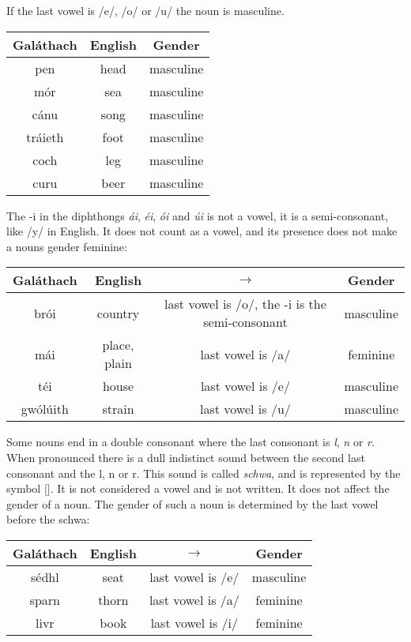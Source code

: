 If the last vowel is /e/, /o/ or /u/ the noun is masculine.
\begin{table}[H]
\centering
\begin{tabu}{c|c|c}
  \textbf{Gal\'{a}thach} & \textbf{English} & \textbf{Gender}\\
  \toprule
  pen & head & masculine\\
  m\'{o}r & sea & masculine\\
  c\'{a}nu & song & masculine\\
  tr\'{a}ieth & foot & masculine\\
  coch & leg & masculine\\
  curu & beer & masculine
\end{tabu}
\label{example_gender_last_vowel_eou}
\end{table}

The -i in the diphthongs \textit{\'{a}i}, \textit{\'{e}i}, \textit{\'{o}i} and \textit{\'{u}i} is not a vowel, it is a semi-consonant, like /y/ in English. It does not count as a vowel, and its presence does not make a nouns gender feminine:
\begin{table}[H]
\centering
\begin{tabu}{c|c|c|c}
  \textbf{Gal\'{a}thach} & \textbf{English} & $\rightarrow$ & \textbf{Gender}\\
  \toprule
  br\'{o}i & country & last vowel is /o/, the -i is the semi-consonant & masculine\\
  m\'{a}i & place, plain & last vowel is /a/ & feminine\\
  t\'{e}i & house & last vowel is /e/ & masculine\\
  gw\'{o}l\'{u}ith & strain & last vowel is /u/ & masculine
\end{tabu}
\label{example_gender_last_vowel_semi_consonant}
\end{table}

Some nouns end in a double consonant where the last consonant is \textit{l}, \textit{n} or \textit{r}. When pronounced there is a dull indistinct sound between the second last consonant and the l, n or r. This sound is called \textit{schwa}, and is represented by the symbol $[$\textschwa$]$. It is not considered a vowel and is not written. It does not affect the gender of a noun. The gender of such a noun is determined by the last vowel before the schwa:
\begin{table}[H]
\centering
\begin{tabu}{c|c|c|c}
  \textbf{Gal\'{a}thach} & \textbf{English} & $\rightarrow$ & \textbf{Gender}\\
  \toprule
  s\'{e}dhl & seat & last vowel is /e/ & masculine\\
  sparn & thorn & last vowel is /a/ & feminine\\
  livr & book & last vowel is /i/ & feminine
\end{tabu}
\label{example_gender_end_in_double_consonant}
\end{table}

